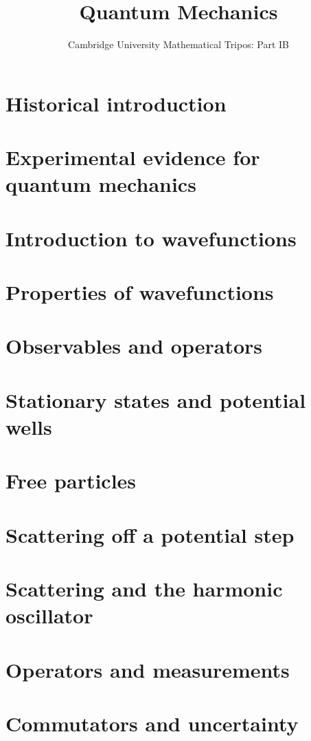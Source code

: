 \documentclass{article}
\title{Quantum Mechanics}
\author{Cambridge University Mathematical Tripos: Part IB}
\begin{document}
\maketitle

\tableofcontentsnewpage{}

\section{Historical introduction}

\section{Experimental evidence for quantum mechanics}

\section{Introduction to wavefunctions}

\section{Properties of wavefunctions}

\section{Observables and operators}

\section{Stationary states and potential wells}

\section{Free particles}

\section{Scattering off a potential step}

\section{Scattering and the harmonic oscillator}

\section{Operators and measurements}

\section{Commutators and uncertainty}

\end{document}
